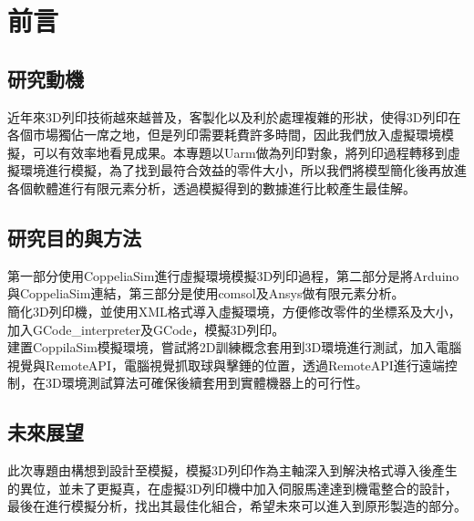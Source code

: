 \chapter{前言}
\renewcommand{\baselinestretch}{10.0} %
\setcounter{page}{1}  %
\fontsize{14pt}{2.5pt}\sectionef
\section{研究動機}
近年來3D列印技術越來越普及，客製化以及利於處理複雜的形狀，使得3D列印在各個市場獨佔一席之地，但是列印需要耗費許多時間，因此我們放入虛擬環境模擬，可以有效率地看見成果。本專題以Uarm做為列印對象，將列印過程轉移到虛擬環境進行模擬，為了找到最符合效益的零件大小，所以我們將模型簡化後再放進各個軟體進行有限元素分析，透過模擬得到的數據進行比較產生最佳解。\\

\section{研究目的與方法}
第一部分使用CoppeliaSim進行虛擬環境模擬3D列印過程，第二部分是將Arduino與CoppeliaSim連結，第三部分是使用comsol及Ansys做有限元素分析。\\

簡化3D列印機，並使用XML格式導入虛擬環境，方便修改零件的坐標系及大小，加入GCode_interpreter及GCode，模擬3D列印。\\

建置CoppilaSim模擬環境，嘗試將2D訓練概念套用到3D環境進行測試，加入電腦視覺與RemoteAPI，電腦視覺抓取球與擊錘的位置，透過RemoteAPI進行遠端控制，在3D環境測試算法可確保後續套用到實體機器上的可行性。\\
 

\section{未來展望}

此次專題由構想到設計至模擬，模擬3D列印作為主軸深入到解決格式導入後產生的異位，並未了更擬真，在虛擬3D列印機中加入伺服馬達達到機電整合的設計，最後在進行模擬分析，找出其最佳化組合，希望未來可以進入到原形製造的部分。\\


\renewcommand{\baselinestretch}{0.5} %